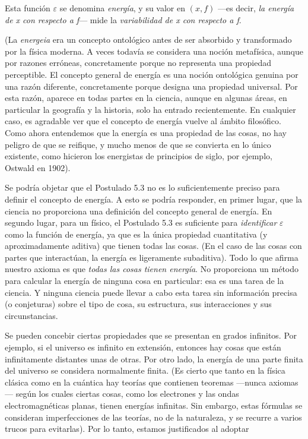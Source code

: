\begin{justifying}
    \noindent Esta función $\varepsilon$ se denomina \textit{energía}, y su valor en $(x, f)$ —es decir, \textit{la energía de x con respecto a f}— mide la \textit{variabilidad de x con respecto a f}.

    (La \textit{energeia} era un concepto ontológico antes de ser absorbido y transformado por la física moderna. A veces todavía se considera una noción metafísica, aunque por razones erróneas, concretamente 
    porque no representa una propiedad perceptible. El concepto general de energía es una noción ontológica genuina por una razón diferente, concretamente porque designa una propiedad universal. Por esta razón, 
    aparece en todas partes en la ciencia, aunque en algunas áreas, en particular la geografía y la historia, solo ha entrado recientemente. En cualquier caso, es agradable ver que el concepto de energía vuelve 
    al ámbito filosófico. Como ahora entendemos que la energía es una propiedad de las cosas, no hay peligro de que se reifique, y mucho menos de que se convierta en lo único existente, como hicieron los energistas 
    de principios de siglo, por ejemplo, Ostwald en 1902).

    Se podría objetar que el Postulado 5.3 no es lo suficientemente preciso para definir el concepto de energía. A esto se podría responder, en primer lugar, que la ciencia no proporciona una definición del concepto 
    general de energía. En segundo lugar, para un físico, el Postulado 5.3 es suficiente para \textit{identificar} $\varepsilon$ como la función de energía, ya que es la única propiedad cuantitativa (y aproximadamente aditiva) que tienen 
    todas las cosas. (En el caso de las cosas con partes que interactúan, la energía es ligeramente subaditiva). Todo lo que afirma nuestro axioma es que \textit{todas las cosas tienen energía}. No proporciona un método para 
    calcular la energía de ninguna cosa en particular: esa es una tarea de la ciencia. Y ninguna ciencia puede llevar a cabo esta tarea sin información precisa (o conjeturas) sobre el tipo de cosa, su estructura, sus 
    interacciones y sus circunstancias.

    Se pueden concebir ciertas propiedades que se presentan en grados infinitos. Por ejemplo, si el universo es infinito en extensión, entonces hay cosas que están infinitamente distantes unas de otras. Por otro lado, la energía de una parte 
    finita del universo se considera normalmente finita. (Es cierto que tanto en la física clásica como en la cuántica hay teorías que contienen teoremas —nunca axiomas— según los cuales ciertas cosas, como los electrones y las ondas 
    electromagnéticas planas, tienen energías infinitas. Sin embargo, estas fórmulas se consideran imperfecciones de las teorías, no de la naturaleza, y se recurre a varios trucos para evitarlas). Por lo tanto, estamos justificados al adoptar


\end{justifying}

